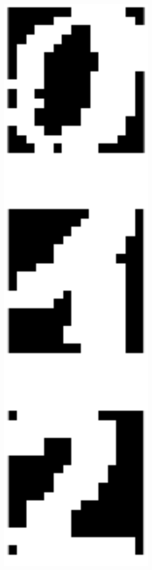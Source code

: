 \documentclass[pdftex,11pt,a4paper]{article}
\begin{document}
\begin{figure}[htb]
\centering
\begin{minipage}{0.08\textwidth}
\includegraphics[width=0.9\textwidth]{figs/attractors.png}

\end{minipage}
\end{figure}
\end{document}
